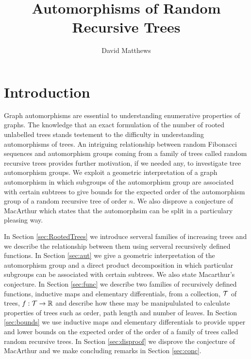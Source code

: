 
\DeclareMathOperator{\F}{\mathcal{F}}
\DeclareMathOperator{\R}{\mathcal{R}}
\DeclareMathOperator{\La}{\mathcal{L}}
\DeclareMathOperator{\V}{\mathcal{V}}
\DeclareMathOperator{\Aut}{Aut}
\usepackage{amssymb}
\title{Automorphisms of Random Recursive Trees}
\author{David Matthews}

\maketitle
\section{Introduction}
Graph automorphisms are essential to understanding enumerative properties of graphs.  The knowledge that an exact formulation of 
the number of rooted unlabelled trees stands testement to the difficulty in understanding automorphisms of trees.  An intriguing 
relationship between random Fibonacci sequences and automorphism groups coming from a family of trees called random recursive trees 
provides further motivation, if we needed any, to investigate tree automorphism groups.  We exploit a geometric interpretation of 
a graph automorphism in which subgroups of the automorphism group are associated with certain subtrees to give bounds for the 
expected order of the automorphism group of a random recursive tree of order $n$. We also disprove a conjecture of MacArthur 
\cite{} which states that the automorphsim can be split in a particulary pleasing way.

In Section \ref{sec:RootedTrees} we introduce serveral families of increasing trees and we describe the relationship between them 
using serveral recursively defined functions.  In Section \ref{sec:aut} we give a geometric interpretation of the automorphism group and a 
direct product decomposition in which particular subgroups can be associated with certain subtrees. We also state Macarthur's conjecture.  
In Section \ref{sec:func} we describe two families of recursively defined functions, inductive maps and elementary differentials, from a collection, $\operatorname{\mathcal{T}}$ of trees,  
$f:\operatorname{\mathcal{T}} \rightarrow \mathbb{R}$ and describe how these may be manipululated to calculate properties of trees such as order, path length and 
number of leaves.  In Section \ref{sec:bounds} we use inductive maps and elementary differentials to provide upper and lower bounds on the 
expected order of the order of a family of trees called random recursive trees.  In Section \ref{sec:disproof}  we disprove the conjecture 
of MacArthur and we make concluding remarks in Section \ref{sec:conc}.  


